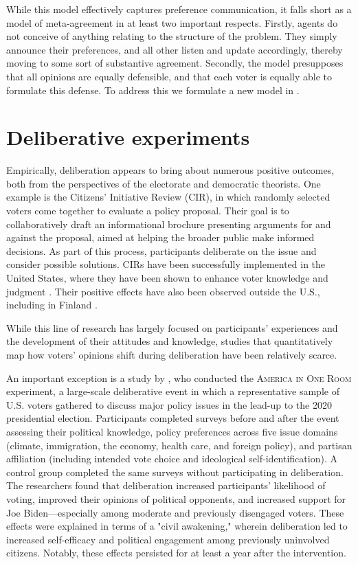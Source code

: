 While this model effectively captures preference communication, it falls short
as a model of meta-agreement in at least two important respects. Firstly,
agents do not conceive of anything relating to the structure of the problem.
They simply announce their preferences, and all other listen and update
accordingly, thereby moving to some sort of substantive agreement. Secondly,
the model presupposes that all opinions are equally defensible, and that each
voter is equally able to formulate this defense. To address this we formulate a
new model in .


\section{Deliberative experiments}


Empirically, deliberation appears to bring about numerous positive outcomes,
both from the perspectives of the electorate and democratic theorists. One
example is the Citizens' Initiative Review (CIR), in which randomly selected
voters come together to evaluate a policy proposal. Their goal is to
collaboratively draft an informational brochure presenting arguments for and
against the proposal, aimed at helping the broader public make informed
decisions. As part of this process, participants deliberate on the issue and
consider possible solutions. CIRs have been successfully implemented in the
United States, where they have been shown to enhance voter knowledge and
judgment \cite{gastilHopeDemocracyHow2020}. Their positive effects have also
been observed outside the U.S., including in Finland
\cite{setalaDeliberativeMinipublicsFacilitating2023}.

While this line of research has largely focused on participants’ experiences
and the development of their attitudes and knowledge, studies that
quantitatively map how voters’ opinions shift during deliberation have been
relatively scarce.

An important exception is a study by \citet{fishkinCanDeliberationHave2024}, who conducted
the \textsc{America in One Room} experiment, a large-scale deliberative event in which a
representative sample of U.S. voters gathered to discuss major policy issues in
the lead-up to the 2020 presidential election. Participants completed surveys
before and after the event assessing their political knowledge, policy
preferences across five issue domains (climate, immigration, the economy,
health care, and foreign policy), and partisan affiliation (including intended
vote choice and ideological self-identification). A control group completed the
same surveys without participating in deliberation. The researchers found that
deliberation increased participants’ likelihood of voting, improved their
opinions of political opponents, and increased support for Joe Biden—especially
among moderate and previously disengaged voters. These effects were explained
in terms of a "civil awakening," wherein deliberation led to increased
self-efficacy and political engagement among previously uninvolved citizens.
Notably, these effects persisted for at least a year after the intervention.

